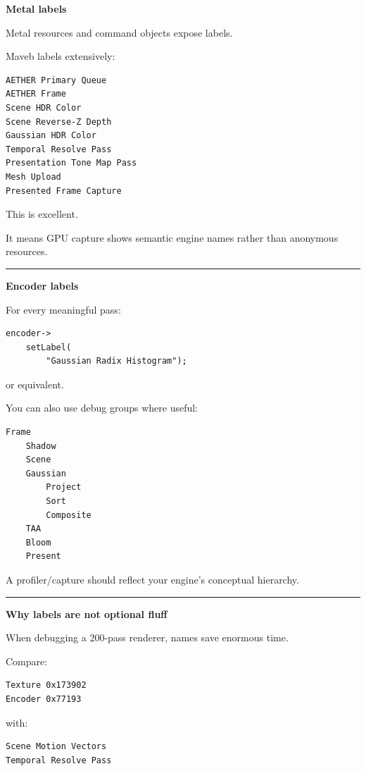 \textbf{Metal labels}

Metal resources and command objects expose labels.

Maveb labels extensively:

\begin{verbatim}
AETHER Primary Queue
AETHER Frame
Scene HDR Color
Scene Reverse-Z Depth
Gaussian HDR Color
Temporal Resolve Pass
Presentation Tone Map Pass
Mesh Upload
Presented Frame Capture
\end{verbatim}

This is excellent.

It means GPU capture shows semantic engine names rather than anonymous resources.

\begin{center}\rule{0.5\linewidth}{0.5pt}\end{center}

\textbf{Encoder labels}

For every meaningful pass:

\begin{verbatim}
encoder->
    setLabel(
        "Gaussian Radix Histogram");
\end{verbatim}

or equivalent.

You can also use debug groups where useful:

\begin{verbatim}
Frame
    Shadow
    Scene
    Gaussian
        Project
        Sort
        Composite
    TAA
    Bloom
    Present
\end{verbatim}

A profiler/capture should reflect your engine's conceptual hierarchy.

\begin{center}\rule{0.5\linewidth}{0.5pt}\end{center}

\textbf{Why labels are not optional fluff}

When debugging a 200-pass renderer, names save enormous time.

Compare:

\begin{verbatim}
Texture 0x173902
Encoder 0x77193
\end{verbatim}

with:

\begin{verbatim}
Scene Motion Vectors
Temporal Resolve Pass
\end{verbatim}


